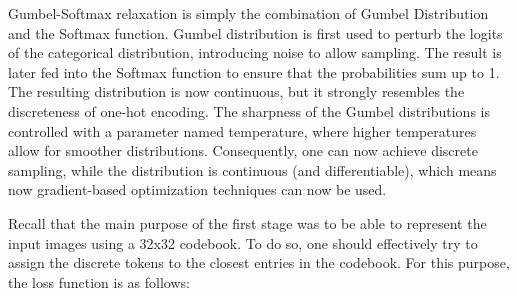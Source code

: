 \documentclass{article}
\begin{document}
Gumbel-Softmax relaxation is simply the combination of Gumbel Distribution and the Softmax function. Gumbel distribution is first used to perturb the logits of the categorical distribution, introducing noise to allow sampling. The result is later fed into the Softmax function to ensure that the probabilities sum up to 1. The resulting distribution is now continuous, but it strongly resembles the discreteness of one-hot encoding. The sharpness of the Gumbel distributions is controlled with a parameter named temperature, where higher temperatures allow for smoother distributions. Consequently, one can now achieve discrete sampling, while the distribution is continuous (and differentiable), which means now gradient-based optimization techniques can now be used.

Recall that the main purpose of the first stage was to be able to represent the input images using a 32x32 codebook. To do so, one should effectively try to assign the discrete tokens to the closest entries in the codebook. For this purpose, the loss function is as follows:

\begin{figure}[h]
\centering
{}
\end{figure}
\end{document}
